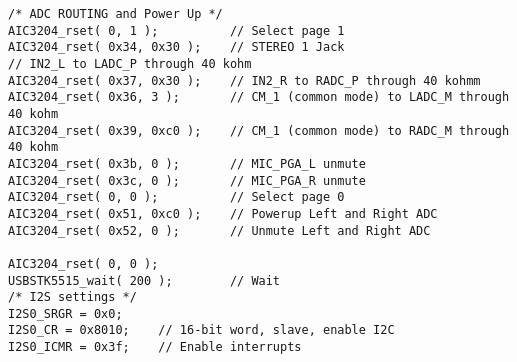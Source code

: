 \begin{lstlisting}
/* ADC ROUTING and Power Up */
AIC3204_rset( 0, 1 );          // Select page 1
AIC3204_rset( 0x34, 0x30 );    // STEREO 1 Jack
// IN2_L to LADC_P through 40 kohm
AIC3204_rset( 0x37, 0x30 );    // IN2_R to RADC_P through 40 kohmm
AIC3204_rset( 0x36, 3 );       // CM_1 (common mode) to LADC_M through 40 kohm
AIC3204_rset( 0x39, 0xc0 );    // CM_1 (common mode) to RADC_M through 40 kohm
AIC3204_rset( 0x3b, 0 );       // MIC_PGA_L unmute
AIC3204_rset( 0x3c, 0 );       // MIC_PGA_R unmute
AIC3204_rset( 0, 0 );          // Select page 0
AIC3204_rset( 0x51, 0xc0 );    // Powerup Left and Right ADC
AIC3204_rset( 0x52, 0 );       // Unmute Left and Right ADC

AIC3204_rset( 0, 0 );    
USBSTK5515_wait( 200 );        // Wait
/* I2S settings */
I2S0_SRGR = 0x0;
I2S0_CR = 0x8010;    // 16-bit word, slave, enable I2C
I2S0_ICMR = 0x3f;    // Enable interrupts


\end{lstlisting}
